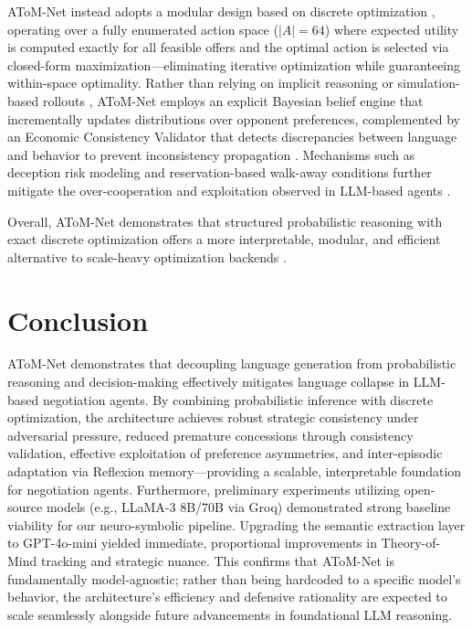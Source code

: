 \documentclass[11pt]{article}
\begin{document}
AToM-Net instead adopts a modular design based on discrete optimization \cite{decoupling}, operating over a fully enumerated action space ($|A|=64$) where expected utility is computed exactly for all feasible offers and the optimal action is selected via closed-form maximization—eliminating iterative optimization while guaranteeing within-space optimality. Rather than relying on implicit reasoning or simulation-based rollouts \cite{llmdecision}, AToM-Net employs an explicit Bayesian belief engine that incrementally updates distributions over opponent preferences, complemented by an Economic Consistency Validator that detects discrepancies between language and behavior \cite{deception} to prevent inconsistency propagation \cite{decoupling}. Mechanisms such as deception risk modeling and reservation-based walk-away conditions further mitigate the over-cooperation and exploitation observed in LLM-based agents \cite{deception,alignmenttax,bargainingeval}.

Overall, AToM-Net demonstrates that structured probabilistic reasoning with exact discrete optimization offers a more interpretable, modular, and efficient alternative to scale-heavy optimization backends \cite{decoupling}.


\section{Conclusion}
AToM-Net demonstrates that decoupling language generation from probabilistic reasoning and decision-making effectively mitigates language collapse in LLM-based negotiation agents. By combining probabilistic inference with discrete optimization, the architecture achieves robust strategic consistency under adversarial pressure, reduced premature concessions through consistency validation, effective exploitation of preference asymmetries, and inter-episodic adaptation via Reflexion memory—providing a scalable, interpretable foundation for negotiation agents. Furthermore, preliminary experiments utilizing open-source models (e.g., LLaMA-3 8B/70B via Groq) demonstrated strong baseline viability for our neuro-symbolic pipeline. Upgrading the semantic extraction layer to GPT-4o-mini yielded immediate, proportional improvements in Theory-of-Mind tracking and strategic nuance. This confirms that AToM-Net is fundamentally model-agnostic; rather than being hardcoded to a specific model's behavior, the architecture's efficiency and defensive rationality are expected to scale seamlessly alongside future advancements in foundational LLM reasoning.
\end{document}

